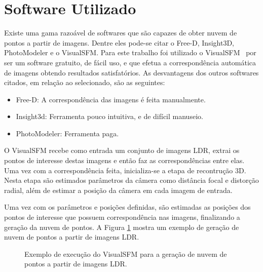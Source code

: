 \section{Software Utilizado} \label{pontosSoftware}

Existe uma gama razoável de softwares que são capazes de obter nuvem de pontos a partir de imagens. Dentre eles pode-se citar o Free-D, Insight3D, PhotoModeler e o VisualSFM. Para este trabalho foi utilizado o VisualSFM~\cite{visualSFM} por ser um software gratuito, de fácil uso, e que efetua a correspondência automática de imagens obtendo resultados satisfatórios. As desvantagens dos outros softwares citados, em relação ao selecionado, são as seguintes:

\begin{itemize}
\item Free-D: A correspondência das imagens é feita manualmente.
\item Insight3d: Ferramenta pouco intuitiva, e de difícil manuseio.
\item PhotoModeler: Ferramenta paga.
\end{itemize}

O VisualSFM recebe como entrada um conjunto de imagens LDR, extrai os pontos de interesse destas imagens e então faz as correspondências entre elas. Uma vez com a correspondência feita, inicializa-se a etapa de recontrução 3D. Nesta etapa são estimados parâmetros da câmera como distância focal e distorção radial, além de estimar a posição da câmera em cada imagem de entrada.

Uma vez com os parâmetros e posições definidas, são estimadas as posições dos pontos de interesse que possuem correspondência nas imagens, finalizando a geração da nuvem de pontos. A Figura \ref{figExemploSFM} mostra um exemplo de geração de nuvem de pontos a partir de imagens LDR.

\begin{figure}[H]
  \centering
  \quad %
  \quad %
  \caption{Exemplo de execução do VisualSFM para a geração de nuvem de pontos a partir de imagens LDR.}
  \label{figExemploSFM}
\end{figure}
